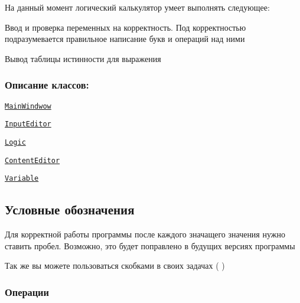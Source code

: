 На данный момент логический калькулятор умеет выполнять следующее\+:
\begin{DoxyItemize}
\item Ввод и проверка переменных на корректность. Под корректностью подразумевается правильное написание букв и операций над ними
\item Вывод таблицы истинности для выражения
\end{DoxyItemize}

\subsubsection*{Описание классов\+:}


\begin{DoxyItemize}
\item \href{https://github.com/mvngr/logic_calculator/tree/master#mainwindow}{\tt Main\+Windwow}
\item \href{https://github.com/mvngr/logic_calculator/tree/master#inputeditor}{\tt Input\+Editor}
\item \href{https://github.com/mvngr/logic_calculator/tree/master#logic}{\tt Logic}
\item \href{https://github.com/mvngr/logic_calculator/tree/master#contenteditor}{\tt Content\+Editor}
\item \href{https://github.com/mvngr/logic_calculator/tree/master#variable}{\tt Variable}
\end{DoxyItemize}

\subsection*{Условные обозначения}

Для корректной работы программы после каждого значащего значения нужно ставить пробел. Возможно, это будет поправлено в будущих версиях программы

Так же вы можете пользоваться скобками в своих задачах {\ttfamily ( )}

\subsubsection*{Операции}

